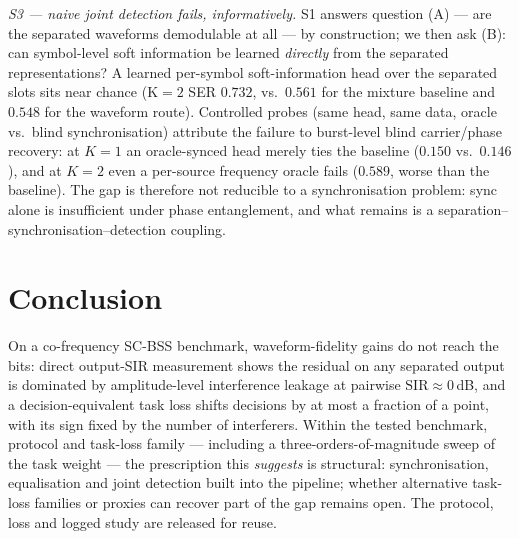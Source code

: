 \documentclass[journal]{IEEEtran}
\newcommand{\sir}{\mathrm{SIR}}
\begin{document}
\emph{S3 --- naive joint detection fails, informatively.} S1 answers
question (A) --- are the separated waveforms demodulable at all --- by
construction; we then ask (B): can symbol-level soft information be
learned \emph{directly} from the separated representations? A learned
per-symbol soft-information head over the separated slots sits near
chance (K${=2}$ SER $0.732$, vs.\ $0.561$ for the mixture baseline and
$0.548$ for the waveform route). Controlled probes (same head, same
data, oracle vs.\ blind synchronisation) attribute the failure to
burst-level blind carrier/phase recovery: at $K{=}1$ an oracle-synced
head merely ties the baseline ($0.150$ vs.\ $0.146$), and at $K{=}2$
even a per-source frequency oracle fails ($0.589$, worse than the
baseline). The gap is therefore not reducible to a synchronisation
problem: sync alone is insufficient under phase entanglement, and what
remains is a separation--synchronisation--detection coupling.

\section{Conclusion}
\label{sec:concl}

On a co-frequency SC-BSS benchmark, waveform-fidelity gains do not
reach the bits: direct output-SIR measurement shows the residual on any
separated output is dominated by amplitude-level interference leakage
at pairwise $\sir \approx 0$\,dB, and a decision-equivalent task loss shifts
decisions by at most a fraction of a point, with its sign fixed by the
number of interferers. Within the tested benchmark, protocol and
task-loss family --- including a three-orders-of-magnitude sweep of the
task weight --- the prescription this \emph{suggests} is structural:
synchronisation, equalisation and joint detection built into the
pipeline; whether alternative task-loss families or proxies can
recover part of the gap remains open. The protocol, loss and logged
study are released for reuse.
\end{document}
